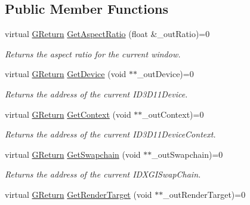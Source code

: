 \subsection*{Public Member Functions}
\begin{DoxyCompactItemize}
\item 
virtual \mbox{\hyperlink{namespaceGW_a67a839e3df7ea8a5c5686613a7a3de21}{G\+Return}} \mbox{\hyperlink{classGW_1_1GRAPHICS_1_1GDirectX11Surface_a4ae8372993803025a14a8471835ed231}{Get\+Aspect\+Ratio}} (float \&\+\_\+out\+Ratio)=0
\begin{DoxyCompactList}\small\item\em Returns the aspect ratio for the current window. \end{DoxyCompactList}\item 
virtual \mbox{\hyperlink{namespaceGW_a67a839e3df7ea8a5c5686613a7a3de21}{G\+Return}} \mbox{\hyperlink{classGW_1_1GRAPHICS_1_1GDirectX11Surface_a076c4f3a07f79f578185416be449ebd2}{Get\+Device}} (void $\ast$$\ast$\+\_\+out\+Device)=0
\begin{DoxyCompactList}\small\item\em Returns the address of the current I\+D3\+D11\+Device. \end{DoxyCompactList}\item 
virtual \mbox{\hyperlink{namespaceGW_a67a839e3df7ea8a5c5686613a7a3de21}{G\+Return}} \mbox{\hyperlink{classGW_1_1GRAPHICS_1_1GDirectX11Surface_aceaa2e22cbdee6c651cf2045d9320041}{Get\+Context}} (void $\ast$$\ast$\+\_\+out\+Context)=0
\begin{DoxyCompactList}\small\item\em Returns the address of the current I\+D3\+D11\+Device\+Context. \end{DoxyCompactList}\item 
virtual \mbox{\hyperlink{namespaceGW_a67a839e3df7ea8a5c5686613a7a3de21}{G\+Return}} \mbox{\hyperlink{classGW_1_1GRAPHICS_1_1GDirectX11Surface_a8388438c79a82a10f595e10b0bbaab2c}{Get\+Swapchain}} (void $\ast$$\ast$\+\_\+out\+Swapchain)=0
\begin{DoxyCompactList}\small\item\em Returns the address of the current I\+D\+X\+G\+I\+Swap\+Chain. \end{DoxyCompactList}\item 
virtual \mbox{\hyperlink{namespaceGW_a67a839e3df7ea8a5c5686613a7a3de21}{G\+Return}} \mbox{\hyperlink{classGW_1_1GRAPHICS_1_1GDirectX11Surface_a953f4809860408b0e99928ac8b9b6a53}{Get\+Render\+Target}} (void $\ast$$\ast$\+\_\+out\+Render\+Target)=0

\end{DoxyCompactItemize}
